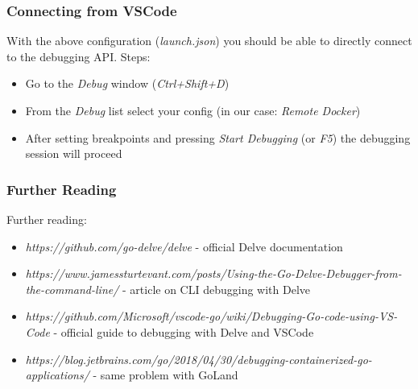 \documentclass[pdf,xcolor=dvipsnames,noparindent]{beamer}
\begin{document}
\begin{frame}
  \frametitle{Connecting from VSCode}
  With the above configuration (\emph{launch.json}) you should be able
  to directly connect to the debugging API.
  \pause
  \newline
  \newline
  Steps:
  \pause
  \begin{itemize}
  \item Go to the \emph{Debug} window (\emph{Ctrl+Shift+D})
    \pause
  \item From the \emph{Debug} list select your config (in our case: \emph{Remote Docker})
    \pause
  \item After setting breakpoints and pressing \emph{Start Debugging} (or \emph{F5}) the debugging session will proceed
  \end{itemize}
\end{frame}

\begin{frame}
  \frametitle{Further Reading}
  Further reading:
  \begin{itemize}
  \item \emph{https://github.com/go-delve/delve} - official Delve documentation
  \item \emph{https://www.jamessturtevant.com/posts/Using-the-Go-Delve-Debugger-from-the-command-line/} - article on CLI debugging with Delve
  \item \emph{https://github.com/Microsoft/vscode-go/wiki/Debugging-Go-code-using-VS-Code} - official guide to debugging with Delve and VSCode
  \item \emph{https://blog.jetbrains.com/go/2018/04/30/debugging-containerized-go-applications/} - same problem with GoLand
  \end{itemize}
\end{frame}

\end{document}

